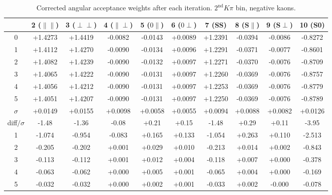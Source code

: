 \begin{table}[h!]
    \center\footnotesize

 \caption{\small Corrected angular acceptance weights after each iteration. $2^{\text{nd}}K\pi$ bin, negative kaons.}  
     \begin{tabular}{c c c c c c c c c c}
            & 2 ($\parallel\parallel$) & 3 ($\perp\perp$) & 4 ($\parallel\perp$) & 5 ($0\parallel$) & 
            6 ($0\perp$) & 7 (SS) & 8 (S$\parallel$) & 9 (S$\perp$) & 10 (S0) \\
      \hline
      0 & +1.4273 & +1.4419 & -0.0082 & -0.0143 & +0.0089 & +1.2391 & -0.0394 & -0.0086 & -0.8272\\
      1 & +1.4112 & +1.4270 & -0.0090 & -0.0134 & +0.0096 & +1.2291 & -0.0371 & -0.0077 & -0.8601\\
      2 & +1.4082 & +1.4239 & -0.0090 & -0.0132 & +0.0097 & +1.2271 & -0.0370 & -0.0076 & -0.8709\\
      3 & +1.4065 & +1.4222 & -0.0090 & -0.0131 & +0.0097 & +1.2260 & -0.0369 & -0.0076 & -0.8757\\
      4 & +1.4056 & +1.4212 & -0.0090 & -0.0131 & +0.0097 & +1.2253 & -0.0369 & -0.0076 & -0.8779\\
      5 & +1.4051 & +1.4207 & -0.0090 & -0.0131 & +0.0097 & +1.2250 & -0.0369 & -0.0076 & -0.8789\\
     \hline
      $\sigma$ & +0.0149 & +0.0155 & +0.0098 & +0.0058 & +0.0055 & +0.0094 & +0.0088 & +0.0082 & +0.0126\\
     diff$/\sigma$& -1.48  & -1.36  & -0.08  & +0.21  & +0.15  & -1.48  & +0.29  & +0.11  & -3.95 \\
      \hline
      1 & -1.074  & -0.954  & -0.083  & +0.165  & +0.133  & -1.054  & +0.263  & +0.110  & -2.513 \\
      2 & -0.205  & -0.202  & +0.001  & +0.029  & +0.010  & -0.213  & +0.014  & +0.002  & -0.843 \\
      3 & -0.113  & -0.112  & +0.001  & +0.012  & +0.004  & -0.118  & +0.007  & +0.000  & -0.378 \\
      4 & -0.063  & -0.062  & +0.000  & +0.005  & +0.001  & -0.065  & +0.004  & +0.000  & -0.169 \\
      5 & -0.032  & -0.032  & +0.000  & +0.002  & +0.001  & -0.033  & +0.002  & -0.000  & -0.078 \\
      \end{tabular}
 \label{tab:norm_weights_evolution_6}
\end{table}

